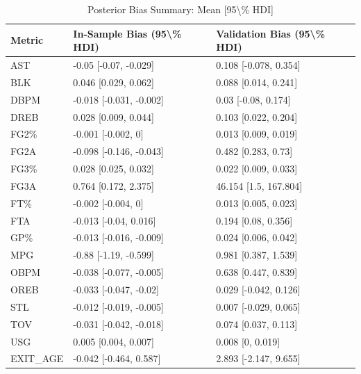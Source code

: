\begin{table}[t]
\caption*{
{\fontsize{20}{25}\selectfont  Posterior Bias Summary: Mean [95\textbackslash{}\% HDI]\fontsize{12}{15}\selectfont }
} 
\fontsize{12.0pt}{14.0pt}\selectfont
\begin{tabular*}{\linewidth}{@{\extracolsep{\fill}}lll}
\toprule
Metric & In-Sample Bias (95\textbackslash{}\% HDI) & Validation Bias (95\textbackslash{}\% HDI) \\ 
\midrule\addlinespace[2.5pt]
AST & -0.05 [-0.07, -0.029] & 0.108 [-0.078, 0.354] \\ 
BLK & 0.046 [0.029, 0.062] & 0.088 [0.014, 0.241] \\ 
DBPM & -0.018 [-0.031, -0.002] & 0.03 [-0.08, 0.174] \\ 
DREB & 0.028 [0.009, 0.044] & 0.103 [0.022, 0.204] \\ 
FG2\% & -0.001 [-0.002, 0] & 0.013 [0.009, 0.019] \\ 
FG2A & -0.098 [-0.146, -0.043] & 0.482 [0.283, 0.73] \\ 
FG3\% & 0.028 [0.025, 0.032] & 0.022 [0.009, 0.033] \\ 
FG3A & 0.764 [0.172, 2.375] & 46.154 [1.5, 167.804] \\ 
FT\% & -0.002 [-0.004, 0] & 0.013 [0.005, 0.023] \\ 
FTA & -0.013 [-0.04, 0.016] & 0.194 [0.08, 0.356] \\ 
GP\% & -0.013 [-0.016, -0.009] & 0.024 [0.006, 0.042] \\ 
MPG & -0.88 [-1.19, -0.599] & 0.981 [0.387, 1.539] \\ 
OBPM & -0.038 [-0.077, -0.005] & 0.638 [0.447, 0.839] \\ 
OREB & -0.033 [-0.047, -0.02] & 0.029 [-0.042, 0.126] \\ 
STL & -0.012 [-0.019, -0.005] & 0.007 [-0.029, 0.065] \\ 
TOV & -0.031 [-0.042, -0.018] & 0.074 [0.037, 0.113] \\ 
USG & 0.005 [0.004, 0.007] & 0.008 [0, 0.019] \\ 
EXIT\_AGE & -0.042 [-0.464, 0.587] & 2.893 [-2.147, 9.655] \\ 
\bottomrule
\end{tabular*}
\end{table}

